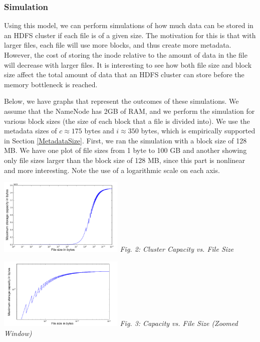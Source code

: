 \documentclass[11pt, a4paper]{article}
\begin{document}
\begin{multicols*}{2}
\subsubsection{Simulation}

Using this model, we can perform simulations of how much data can be stored in an HDFS cluster if each file is of a given size. The motivation for this is that with larger files, each file will use more blocks, and thus create more metadata. However, the cost of storing the inode relative to the amount of data in the file will decrease with larger files. It is interesting to see how both file size and block size affect the total amount of data that an HDFS cluster can store before the memory bottleneck is reached.
	
Below, we have graphs that represent the outcomes of these simulations. We assume that the NameNode has 2GB of RAM, and we perform the simulation for various block sizes (the size of each block that a file is divided into). We use the metadata sizes of $c \approx 175$ bytes and $i \approx 350$ bytes, which is empirically supported in Section \ref{MetadataSize}. First, we ran the simulation with a block size of 128 MB. We have one plot of file sizes from 1 byte to 100 GB and another showing only file sizes larger than the block size of 128 MB, since this part is nonlinear and more interesting. Note the use of a logarithmic scale on each axis.
\begin{center}
	\includegraphics[keepaspectratio=true, width=0.45\textwidth]{logScale}
	\textit{Fig. 2: Cluster Capacity vs. File Size}
\end{center}

\begin{center}
	\includegraphics[keepaspectratio=true, width=0.45\textwidth]{logLogScale}
	\textit{Fig. 3: Capacity vs. File Size (Zoomed Window)}	
\end{center}


\end{multicols*}
\end{document}

